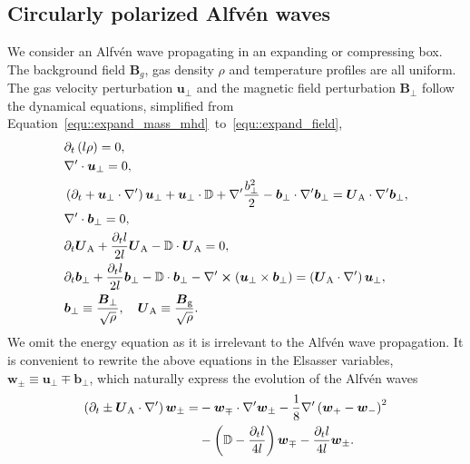 \documentclass[fleqn,usenatbib]{mnras}
\begin{document}
\subsection{Circularly polarized Alfv\'en waves}
\label{app::cpaw}
We consider an Alfv\'en wave propagating in an expanding or compressing box. The background field $\boldsymbol{B}_g$, gas density $\rho$ and temperature profiles are all uniform. The gas velocity perturbation $\boldsymbol{u}_\perp$ and the magnetic field perturbation $\boldsymbol{B}_\perp$ follow the dynamical equations, simplified from Equation~\ref{equ::expand_mass_mhd}~to~\ref{equ::expand_field},
\begin{align}
    &\partial_t \left(l \rho \right) = 0, \\
	&\nabla' \cdot \boldsymbol{u}_\perp = 0, \\
    &\left(\partial_t + \boldsymbol{u}_\perp \cdot \nabla'\right) \boldsymbol{u}_\perp + \boldsymbol{u}_\perp \cdot \mathbb{D} + \nabla' \frac{b_\perp^2}{2} -\boldsymbol{b}_\perp \cdot \nabla' \boldsymbol{b}_\perp  = \boldsymbol{U}_\text{A} \cdot \nabla' \boldsymbol{b}_\perp, \\
    &\nabla' \cdot \boldsymbol{b}_\perp = 0, \\
    &\partial_t \boldsymbol{U}_\text{A} + \frac{\partial_t l}{2l} \boldsymbol{U}_\text{A} - \mathbb{D} \cdot \boldsymbol{U}_\text{A} = 0, \\
    &\partial_{t} \boldsymbol{b}_\perp + \frac{\partial_t l}{2l} \boldsymbol{b}_\perp - \mathbb{D} \cdot \boldsymbol{b}_\perp - \nabla' \cross \left(\boldsymbol{u}_\perp \times\boldsymbol{b}_\perp \right) = \left(\boldsymbol{U}_\text{A} \cdot \nabla'\right) \boldsymbol{u}_\perp, \\
	&\boldsymbol{b}_\perp \equiv \frac{\boldsymbol{B}_\perp}{\sqrt{\rho}}, \quad \boldsymbol{U}_\text{A} \equiv \frac{\boldsymbol{B}_\text{g}}{\sqrt{\rho}}. \notag
\end{align}
We omit the energy equation as it is irrelevant to the Alfv\'en wave propagation. It is convenient to rewrite the above equations in the Elsasser variables, $\boldsymbol{w}_\pm \equiv \boldsymbol{u}_\perp \mp \boldsymbol{b}_\perp$, which naturally express the evolution of the  Alfv\'en waves
\begin{align}
    \left(\partial_t  \pm \boldsymbol{U}_\text{A} \cdot \nabla'\right) \boldsymbol{w}_\pm =& -\boldsymbol{w}_\mp \cdot \nabla' \boldsymbol{w}_\pm - \frac{1}{8} \nabla' \left(\boldsymbol{w}_+ - \boldsymbol{w}_-\right)^2 \notag \\ &- \left(\mathbb{D} - \frac{\partial_t l}{4l}\right) \boldsymbol{w}_\mp - \frac{\partial_t l}{4l} \boldsymbol{w}_\pm.
\end{align}
\end{document}
